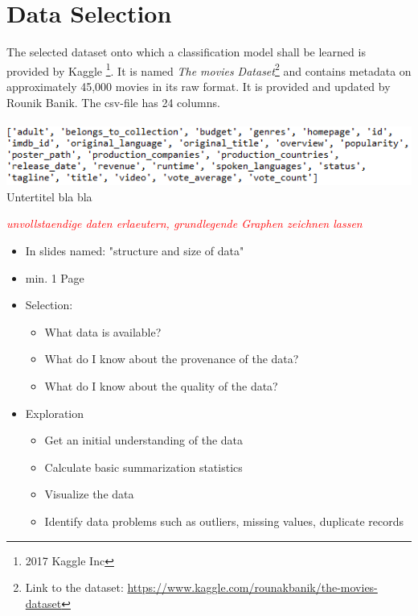 \chapter{Data Selection}
\label{cha:data_selection}
The selected dataset onto which a classification model shall be learned is provided by Kaggle \footnote{2017 Kaggle Inc}. It is named \textit{The movies Dataset}\footnote{Link to the dataset: \hyperref[https://www.kaggle.com/rounakbanik/the-movies-dataset]{https://www.kaggle.com/rounakbanik/the-movies-dataset}} and contains metadata on approximately 45,000 movies in its raw format. It is provided and updated by Rounik Banik. The csv-file has 24 columns.\\\\
\includegraphics[width=\textwidth]{images/Raw_dataset_headers.png}
Untertitel bla bla


\textcolor{red}{\textit{unvollstaendige daten erlaeutern, grundlegende Graphen zeichnen lassen}}




\begin{itemize}
	\item In slides named: "structure and size of data"
	\item min. 1 Page
	\item Selection: 
	\begin{itemize}
		\item What data is available?
		\item What do I know about the provenance of the data?
		\item What do I know about the quality of the data?
	\end{itemize}
	\item Exploration
	\begin{itemize}
		\item Get an initial understanding of the data
		\item Calculate basic summarization statistics
		\item Visualize the data
		\item Identify data problems such as outliers, missing values, duplicate records
	\end{itemize}
\end{itemize}



